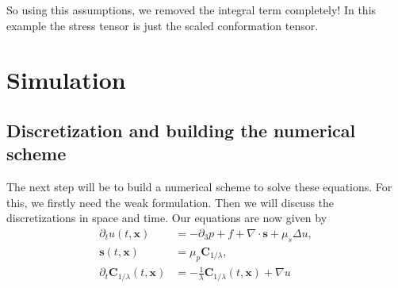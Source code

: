 \documentclass[12pt,a4paper,twoside, open=right]{scrreprt}
\theoremstyle{definition}
\theoremstyle{plain}
\newcommand{\bfs}{\bm{s}}
\newcommand{\bfC}{\bm{C}}
\newcommand{\bfx}{\bm{x}}
\begin{document}
So using this assumptions, we removed the integral term completely! In this example the stress tensor is just the scaled conformation tensor. 
\chapter{Simulation}
\section{Discretization and building the numerical scheme}
The next step will be to build a numerical scheme to solve these equations. For this, we firstly need the weak formulation. Then we will discuss the discretizations in space and time. Our equations are now given by 
\begin{align}
    \label{eq:transfeq1}
    \partial_t u(t,\bfx) &= -\partial_3 p + f +\nabla\cdot \bfs+\mu_s\Delta u,\\
    \label{eq:transfeq2}
    \bfs(t,\bfx)&=\mu_p\bfC_{1/\lambda},\\
    \partial_t\bfC_{1/\lambda}(t,\bfx) &= -\frac{1}{\lambda}\bfC_{1/\lambda}(t,\bfx)+\nabla u
    \label{eq:transfeq3}
\end{align}
\end{document}
